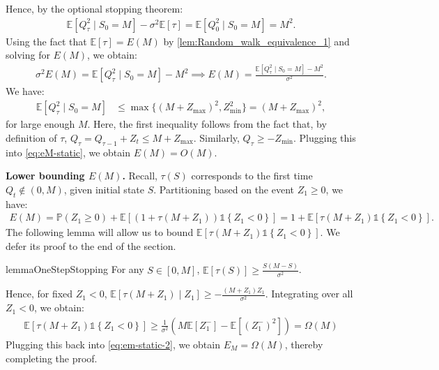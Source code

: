 \documentclass[mnsc,nonblindrev]{informs3}
\newcommand{\E}{\mathbb{E}}
\newcommand{\pr}{\mathbb{P}}
\renewcommand{\Pr}{\pr}
\newcommand{\ind}[1]{\mathds{1}\left\{#1\right\}}
\renewenvironment{proof}[1][Proof]{%
  \par\noindent{\itshape #1.} \ignorespaces
}{%
  \hfill\Halmos\par
}
\begin{document}
\begin{APPENDICES}
\begin{proof}
Hence, by the optional stopping theorem:
\begin{align*}
\E[Q_\tau^2 \mid S_0 = M] - \sigma^2\E[\tau] = \E[Q_0^2 \mid S_0 = M] = M^2.
\end{align*}
Using the fact that $\E[\tau] = E(M)$ by \cref{lem:Random_walk_equivalence_1} and solving for $E(M)$, we obtain:
\begin{align}\label{eq:eM-static}
\sigma^2 E(M) = \E[Q_\tau^2 \mid S_0 = M]-M^2\implies E(M) = \frac{\E[Q_\tau^2 \mid S_0 = M]-M^2}{\sigma^2}.
\end{align}
We have:
{
\begin{align*}
\E[Q_\tau^2 \mid S_0 = M] &\leq \max\{(M+Z_{\max})^2, Z_{\min}^2\} = (M+Z_{\max})^2,
\end{align*}
for large enough $M$. Here, the first inequality follows from the fact that, by definition of $\tau$, $Q_\tau = Q_{\tau-1} + Z_t \leq M+Z_{\max}$. Similarly, $Q_{\tau} \geq -Z_{\min}$.
} Plugging this into \eqref{eq:eM-static}, we obtain $E(M) = O(M)$.

\medskip 

\textbf{Lower bounding $E(M)$.} Recall, $\tau(S)$ corresponds to the first time $Q_t \not\in (0,M)$, given initial state $S$. Partitioning based on the event $Z_1 \geq 0$, we have:
\begin{align}\label{eq:em-static-2}
E(M) = \Pr(Z_1 \geq 0) + \E[(1+\tau(M+Z_1)) \ind{Z_1 < 0}] = 1+\E[\tau(M+Z_1) \ind{Z_1 < 0}].
\end{align}
The following lemma will allow us to bound $\E[\tau(M+Z_1) \ind{Z_1 < 0}]$. We defer its proof to the end of the section.
\begin{restatable}{lemma}{OneStepStopping}\label{eq:one-step-stopping-time}
For any $S \in [0,M]$, $\E[\tau(S)] \geq \frac{S(M-S)}{\sigma^2}$.
\end{restatable}
Hence, for fixed $Z_1 < 0$, $
\E[\tau(M+Z_1) \mid Z_1] \geq -\frac{(M+Z_1)Z_1}{\sigma^2}.$
Integrating over all $Z_1 < 0$, we obtain:
\begin{align*}
\E[\tau(M+Z_1) \ind{Z_1 < 0}] \geq \frac{1}{\sigma^2}\left(M\E[Z_1^-]-\E\left[\left(Z_1^-\right)^2\right]\right) = \Omega(M)
\end{align*}
Plugging this back into \eqref{eq:em-static-2}, we obtain $E_M = \Omega(M)$, thereby completing the proof.
\end{proof}


\end{APPENDICES}
\end{document}
